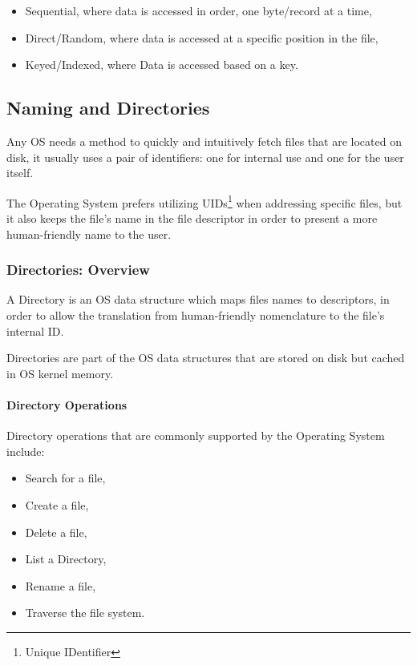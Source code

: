 \documentclass[openright, twoside]{report}
\theoremstyle{definition}
\theoremstyle{example}
\begin{document}
\begin{itemize}
	\item Sequential, where data is accessed in order, one byte/record at a time,
	\item Direct/Random, where data is accessed at a specific position in the file,
	\item Keyed/Indexed, where Data is accessed based on a key.
\end{itemize}

\subsection{Naming and Directories}
Any OS needs a method to quickly and intuitively fetch files that are located 
on disk, it usually uses a pair of identifiers: one for internal use and 
one for the user itself.

The Operating System prefers utilizing UIDs\footnote{Unique IDentifier} when 
addressing specific files, but it also keeps the file's name in the file descriptor
in order to present a more human-friendly name to the user.

\subsubsection{Directories: Overview}
A Directory is an OS data structure which maps files names to descriptors, in 
order to allow the translation from human-friendly nomenclature to the file's 
internal ID.

\begin{center}
	Directories are part of the OS data structures that are stored on disk but 
	cached in OS kernel memory.
\end{center}

\paragraph{Directory Operations}
Directory operations that are commonly supported by the Operating System include:

\begin{multicols}{2}
	\begin{itemize}
		\item Search for a file,
		\item Create a file,
		\item Delete a file,
		\item List a Directory,
		\item Rename a file,
		\item Traverse the file system.
	\end{itemize}
\end{multicols}
\end{document}
